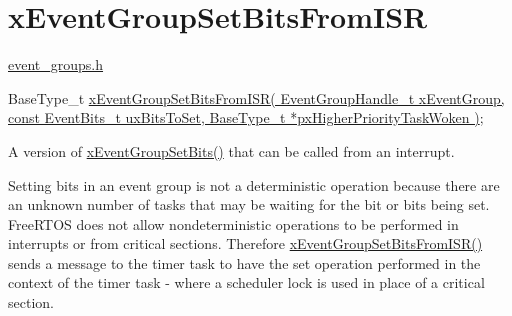 \hypertarget{group__x_event_group_set_bits_from_i_s_r}{}\section{x\+Event\+Group\+Set\+Bits\+From\+I\+SR}
\label{group__x_event_group_set_bits_from_i_s_r}
\hyperlink{event__groups_8h}{event\+\_\+groups.\+h} 
\begin{DoxyPre}
   BaseType\_t \hyperlink{event__groups_8h_a62b68278abac6358369ae8e390988a02}{xEventGroupSetBitsFromISR( EventGroupHandle\_t xEventGroup, const EventBits\_t uxBitsToSet, BaseType\_t *pxHigherPriorityTaskWoken )};
\end{DoxyPre}


A version of \hyperlink{event__groups_8h_a02d7b3bb55f7e11d9c47116266c5fb2e}{x\+Event\+Group\+Set\+Bits()} that can be called from an interrupt.

Setting bits in an event group is not a deterministic operation because there are an unknown number of tasks that may be waiting for the bit or bits being set. Free\+R\+T\+OS does not allow nondeterministic operations to be performed in interrupts or from critical sections. Therefore \hyperlink{event__groups_8h_a62b68278abac6358369ae8e390988a02}{x\+Event\+Group\+Set\+Bits\+From\+I\+S\+R()} sends a message to the timer task to have the set operation performed in the context of the timer task -\/ where a scheduler lock is used in place of a critical section.


